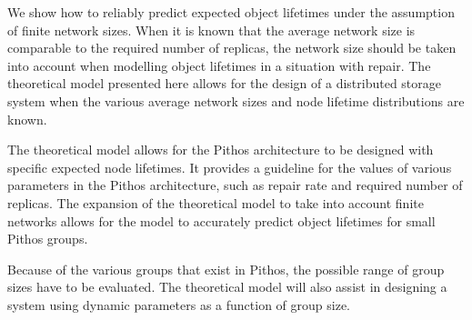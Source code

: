 We show how to reliably predict expected object lifetimes under the assumption of finite network sizes. When it is known that the average network size is comparable to the required number of replicas, the network size should be taken into account when modelling object lifetimes in a situation with repair. The theoretical model presented here allows for the design of a distributed storage system when the various average network sizes and node lifetime distributions are known.

The theoretical model allows for the Pithos architecture to be designed with specific expected node lifetimes. It provides a guideline for the values of various parameters in the Pithos architecture, such as repair rate and required number of replicas. The expansion of the theoretical model to take into account finite networks allows for the model to accurately predict object lifetimes for small Pithos groups.

Because of the various groups that exist in Pithos, the possible range of group sizes have to be evaluated. The theoretical model will also assist in designing a system using dynamic parameters as a function of group size. 